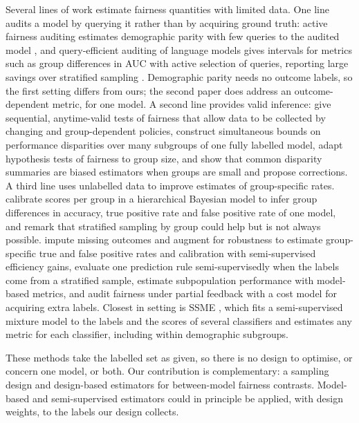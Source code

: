 \documentclass[pdflatex,sn-mathphys-num,iicol]{sn-jnl}
\theoremstyle{thmstyleone}
\theoremstyle{thmstyletwo}
\theoremstyle{thmstylethree}
\begin{document}
Several lines of work estimate fairness quantities with limited data. One line audits a model by querying it rather than by acquiring ground truth: active fairness auditing estimates demographic parity with few queries to the audited model \citep{yan2022active}, and query-efficient auditing of language models gives intervals for metrics such as group differences in AUC with active selection of queries, reporting large savings over stratified sampling \citep{hartmann2026}. Demographic parity needs no outcome labels, so the first setting differs from ours; the second paper does address an outcome-dependent metric, for one model. A second line provides valid inference: \citet{chugg2023} give sequential, anytime-valid tests of fairness that allow data to be collected by changing and group-dependent policies, \citet{cherian2023} construct simultaneous bounds on performance disparities over many subgroups of one fully labelled model, \citet{ferrara2025} adapt hypothesis tests of fairness to group size, and \citet{lum2022} show that common disparity summaries are biased estimators when groups are small and propose corrections. A third line uses unlabelled data to improve estimates of group-specific rates. \citet{ji2020fairness} calibrate scores per group in a hierarchical Bayesian model to infer group differences in accuracy, true positive rate and false positive rate of one model, and remark that stratified sampling by group could help but is not always possible. \citet{gao2025} impute missing outcomes and augment for robustness to estimate group-specific true and false positive rates and calibration with semi-supervised efficiency gains, \citet{gronsbell2022} evaluate one prediction rule semi-supervisedly when the labels come from a stratified sample, \citet{miller2021} estimate subpopulation performance with model-based metrics, and \citet{das2025} audit fairness under partial feedback with a cost model for acquiring extra labels. Closest in setting is SSME \citep{shanmugam2025}, which fits a semi-supervised mixture model to the labels and the scores of several classifiers and estimates any metric for each classifier, including within demographic subgroups.

These methods take the labelled set as given, so there is no design to optimise, or concern one model, or both. Our contribution is complementary: a sampling design and design-based estimators for between-model fairness contrasts. Model-based and semi-supervised estimators could in principle be applied, with design weights, to the labels our design collects.
\end{document}
